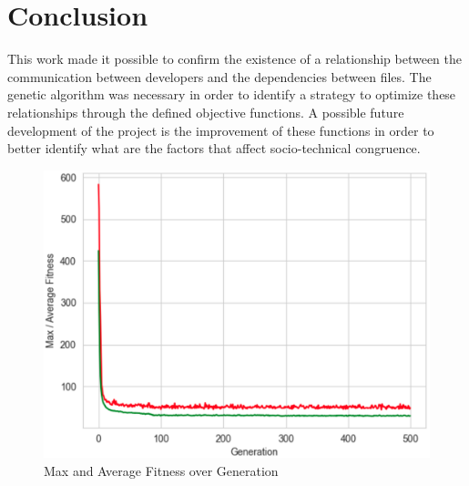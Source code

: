 \documentclass[sigconf]{acmart}
\begin{document}
\section{Conclusion}
This work made it possible to confirm the existence of a relationship between the communication between developers and the dependencies between files. The genetic algorithm was necessary in order to identify a strategy to optimize these relationships through the defined objective functions.
A possible future development of the project is the improvement of these functions in order to better identify what are the factors that affect socio-technical congruence.

\begin{figure}[h]
  \centering
  \includegraphics[width=\linewidth]{img_7}
  \caption{Max and Average Fitness over Generation}
  \Description{}
\end{figure}




\appendix
\end{document}
